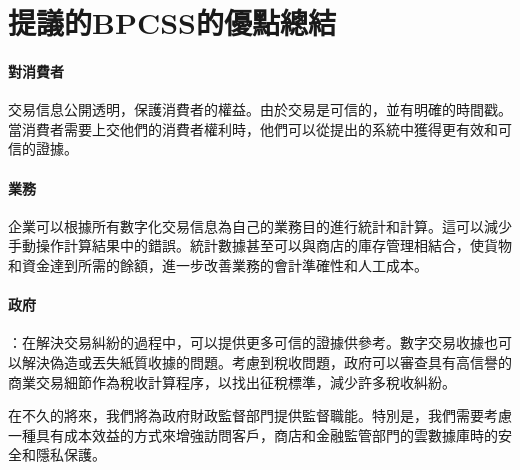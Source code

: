 	\section{提議的BPCSS的優點總結}

		\paragraph{對消費者}交易信息公開透明，保護消費者的權益。由於交易是可信的，並有明確的時間戳。當消費者需要上交他們的消費者權利時，他們可以從提出的系統中獲得更有效和可信的證據。
		\paragraph{業務}企業可以根據所有數字化交易信息為自己的業務目的進行統計和計算。這可以減少手動操作計算結果中的錯誤。統計數據甚至可以與商店的庫存管理相結合，使貨物和資金達到所需的餘額，進一步改善業務的會計準確性和人工成本。
		\paragraph{政府}：在解決交易糾紛的過程中，可以提供更多可信的證據供參考。數字交易收據也可以解決偽造或丟失紙質收據的問題。考慮到稅收問題，政府可以審查具有高信譽的商業交易細節作為稅收計算程序，以找出征稅標準，減少許多稅收糾紛。

在不久的將來，我們將為政府財政監督部門提供監督職能。特別是，我們需要考慮一種具有成本效益的方式來增強訪問客戶，商店和金融監管部門的雲數據庫時的安全和隱私保護。
